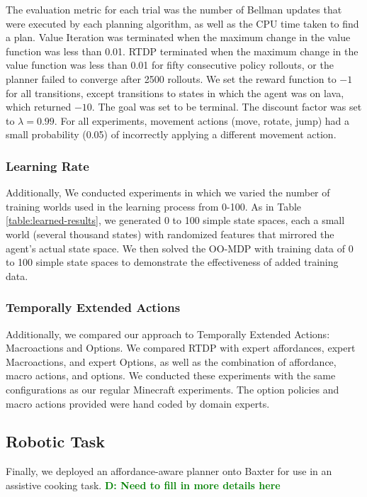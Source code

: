 \documentclass[conference]{IEEEtran}
\newcommand{\dnote}[1]{\textcolor{Green}{\textbf{D: #1}}}
\begin{document}
The evaluation metric for each trial was the
number of Bellman updates that were executed by each planning
algorithm, as well as the CPU time taken to find a plan. Value Iteration was terminated when the maximum change in
the value function was less than 0.01. RTDP terminated when the
maximum change in the value function was less than 0.01 for fifty
consecutive policy rollouts, or the planner failed to converge after 2500 rollouts.
We set the reward function to $-1$ for all transitions, except
transitions to states in which the agent was on lava, which returned 
$-10$. The goal was set to be terminal. The discount
factor was set to $\lambda = 0.99$. For all experiments, movement actions
(move, rotate, jump) had a small probability (0.05) of incorrectly applying a different movement action.

\subsubsection{Learning Rate}
Additionally, We conducted experiments in which we varied the number of training worlds
used in the learning process from 0-100. As in Table \ref{table:learned-results}, we generated 0 to 100 simple state
spaces, each a small world (several thousand states) with randomized features that mirrored the agent's actual state space. We then solved
the OO-MDP with training data of 0 to 100 simple state spaces to demonstrate the effectiveness of added training data.

\subsubsection{Temporally Extended Actions}
Additionally, we compared our approach to Temporally Extended Actions: Macroactions and Options. We compared RTDP with expert affordances,
expert Macroactions, and expert Options, as well as the combination of affordance, macro actions, and options. We conducted these experiments with the same configurations as our regular Minecraft experiments. The option policies and macro actions provided were hand coded by domain experts.

\subsection{Robotic Task}
Finally, we deployed an affordance-aware planner onto Baxter for use in an assistive cooking task. \dnote{Need to fill in more details here}

\end{document}
